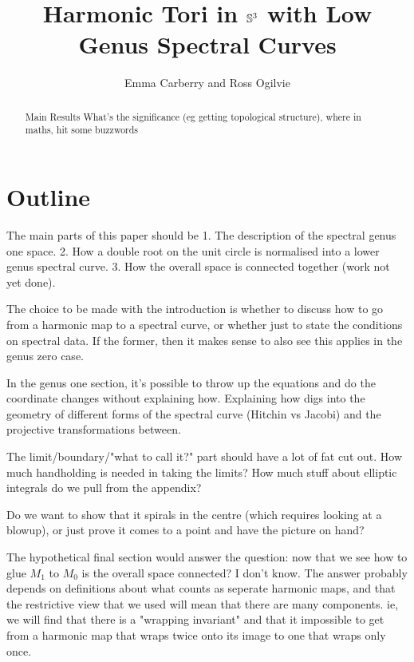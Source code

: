 \documentclass{article}
\begin{document}
\title{Harmonic Tori in $\S^3$ with Low Genus Spectral Curves}
\author{Emma Carberry and Ross Ogilvie}
\date{}
\maketitle

\begin{abstract}
Main Results
What's the significance (eg getting topological structure), where in maths, hit some buzzwords
\end{abstract}

\section{Outline}
The main parts of this paper should be 1. The description of the spectral genus one space. 2. How a double root on the unit circle is normalised into a lower genus spectral curve. 3. How the overall space is connected together (work not yet done).

The choice to be made with the introduction is whether to discuss how to go from a harmonic map to a spectral curve, or whether just to state the conditions on spectral data. If the former, then it makes sense to also see this applies in the genus zero case.

In the genus one section, it's possible to throw up the equations and do the coordinate changes without explaining how. Explaining how digs into the geometry of different forms of the spectral curve (Hitchin vs Jacobi) and the projective transformations between.

The limit/boundary/"what to call it?" part should have a lot of fat cut out. How much handholding is needed in taking the limits? How much stuff about elliptic integrals do we pull from the appendix? 

Do we want to show that it spirals in the centre (which requires looking at a blowup), or just prove it comes to a point and have the picture on hand?

The hypothetical final section would answer the question: now that we see how to glue $M_1$ to $M_0$ is the overall space connected? I don't know. The answer probably depends on definitions about what counts as seperate harmonic maps, and that the restrictive view that we used will mean that there are many components. ie, we will find that there is a "wrapping invariant" and that it impossible to get from a harmonic map that wraps twice onto its image to one that wraps only once.
\end{document}
